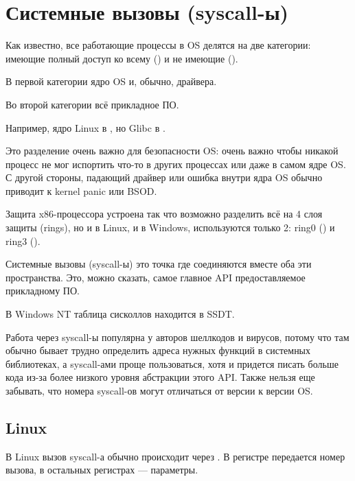 \section{Системные вызовы (syscall-ы)}

\label{syscalls}

Как известно, все работающие процессы в \ac{OS} делятся на две категории:
имеющие полный доступ ко всему  () 
и не имеющие ().

В первой категории ядро \ac{OS} и, обычно, драйвера.

Во второй категории всё прикладное ПО.


Например, ядро Linux в , но Glibc в .

Это разделение очень важно для безопасности \ac{OS}:
очень важно чтобы никакой процесс не мог испортить что-то в других процессах
или даже в самом ядре \ac{OS}.
С другой стороны, падающий драйвер или ошибка внутри ядра \ac{OS} обычно приводит к kernel panic или \ac{BSOD}.

Защита x86-процессора устроена так что возможно разделить всё на 4 слоя защиты (rings), но и в Linux,
и в Windows, используются только 2: ring0 () и ring3 ().

Системные вызовы (syscall-ы)
это точка где соединяются вместе оба эти пространства.
Это, можно сказать, самое главное \ac{API} предоставляемое прикладному ПО.

В \gls{Windows NT} таблица сисколлов находится в \ac{SSDT}.

Работа через syscall-ы популярна у авторов шеллкодов и вирусов,
потому что там обычно бывает трудно определить адреса нужных функций в системных библиотеках,
а syscall-ами проще пользоваться, хотя и придется писать больше
кода из-за более низкого уровня абстракции этого \ac{API}.
Также нельзя еще забывать, что номера syscall-ов могут отличаться от версии к версии OS.

\subsection{Linux}
\label{linux_syscall}

В Linux вызов syscall-а обычно происходит через .
В регистре \EAX передается номер вызова,
в остальных регистрах --- параметры.


